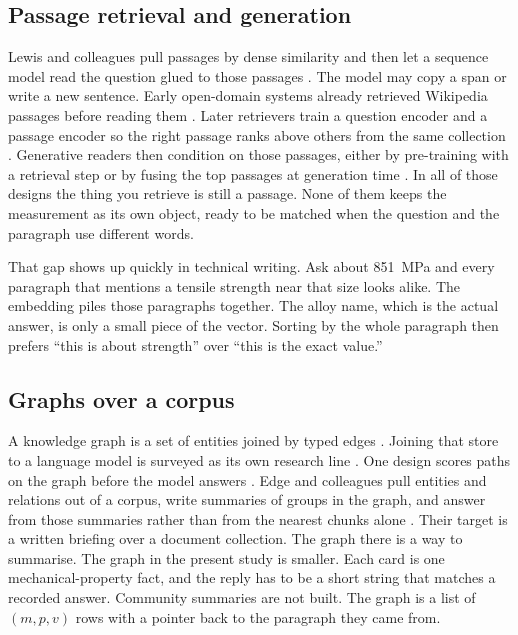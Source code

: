 \documentclass[conference]{IEEEtran}
\begin{document}
\subsection{Passage retrieval and generation}
Lewis and colleagues pull passages by dense similarity and then let a sequence model read the question glued to those passages \cite{lewis2020rag}. The model may copy a span or write a new sentence. Early open-domain systems already retrieved Wikipedia passages before reading them \cite{chen2017drqa}. Later retrievers train a question encoder and a passage encoder so the right passage ranks above others from the same collection \cite{karpukhin2020dpr,xiong2021ance,khattab2020colbert}. Generative readers then condition on those passages, either by pre-training with a retrieval step or by fusing the top passages at generation time \cite{guu2020realm,izacard2021fid,izacard2023atlas,borgeaud2022retro}. In all of those designs the thing you retrieve is still a passage. None of them keeps the measurement as its own object, ready to be matched when the question and the paragraph use different words.

That gap shows up quickly in technical writing. Ask about 851~MPa and every paragraph that mentions a tensile strength near that size looks alike. The embedding piles those paragraphs together. The alloy name, which is the actual answer, is only a small piece of the vector. Sorting by the whole paragraph then prefers ``this is about strength'' over ``this is the exact value.''

\subsection{Graphs over a corpus}
A knowledge graph is a set of entities joined by typed edges \cite{hogan2021kg}. Joining that store to a language model is surveyed as its own research line \cite{pan2024llmkg}. One design scores paths on the graph before the model answers \cite{yasunaga2021qagnn}. Edge and colleagues pull entities and relations out of a corpus, write summaries of groups in the graph, and answer from those summaries rather than from the nearest chunks alone \cite{edge2024graphrag}. Their target is a written briefing over a document collection. The graph there is a way to summarise. The graph in the present study is smaller. Each card is one mechanical-property fact, and the reply has to be a short string that matches a recorded answer. Community summaries are not built. The graph is a list of \((m,p,v)\) rows with a pointer back to the paragraph they came from.
\end{document}

